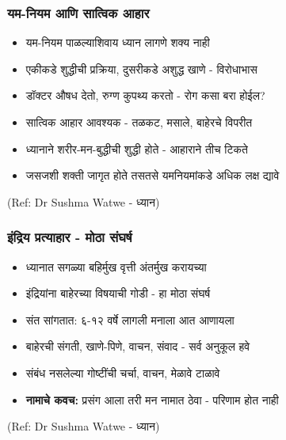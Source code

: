 \begin{frame}[fragile]\frametitle{यम-नियम आणि सात्विक आहार}

	\begin{itemize}
	\item यम-नियम पाळल्याशिवाय ध्यान लागणे शक्य नाही
	\item एकीकडे शुद्धीची प्रक्रिया, दुसरीकडे अशुद्ध खाणे - विरोधाभास
	\item डॉक्टर औषध देतो, रुग्ण कुपथ्य करतो - रोग कसा बरा होईल?
	\item सात्विक आहार आवश्यक - तळकट, मसाले, बाहेरचे विपरीत
	\item ध्यानाने शरीर-मन-बुद्धीची शुद्धी होते - आहाराने तीच टिकते
	\item जसजशी शक्ती जागृत होते तसतसे यमनियमांकडे अधिक लक्ष द्यावे
	\end{itemize}

{\tiny (Ref: Dr Sushma Watwe - ध्यान)}

\end{frame}

\begin{frame}[fragile]\frametitle{इंद्रिय प्रत्याहार - मोठा संघर्ष}

	\begin{itemize}
	\item ध्यानात सगळ्या बहिर्मुख वृत्ती अंतर्मुख करायच्या
	\item इंद्रियांना बाहेरच्या विषयाची गोडी - हा मोठा संघर्ष
	\item संत सांगतात: ६-१२ वर्षे लागली मनाला आत आणायला
	\item बाहेरची संगती, खाणे-पिणे, वाचन, संवाद - सर्व अनुकूल हवे
	\item संबंध नसलेल्या गोष्टींची चर्चा, वाचन, मेळावे टाळावे
	\item \textbf{नामाचे कवच:} प्रसंग आला तरी मन नामात ठेवा - परिणाम होत नाही
	\end{itemize}

{\tiny (Ref: Dr Sushma Watwe - ध्यान)}

\end{frame}

